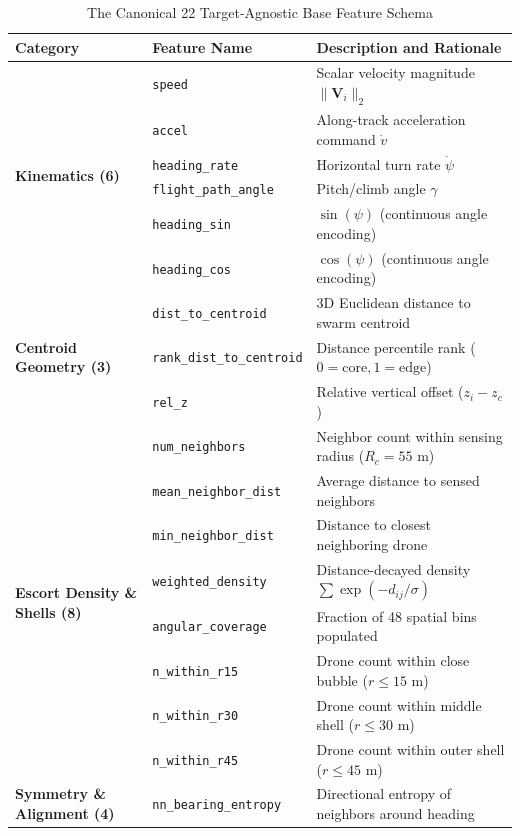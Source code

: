 \documentclass[9pt]{ieeeconf}
\begin{document}
\begin{table}[h]
\centering
\caption{The Canonical 22 Target-Agnostic Base Feature Schema}
\label{tab:feature_schema}
\scriptsize
\begin{tabularx}{\columnwidth}{l l X}
\toprule
\textbf{Category} & \textbf{Feature Name} & \textbf{Description and Rationale} \\
\midrule
\multirow{6}{*}{\textbf{Kinematics (6)}} 
& \texttt{speed} & Scalar velocity magnitude $\|\mathbf{V}_i\|_2$ \\
& \texttt{accel} & Along-track acceleration command $\dot{v}$ \\
& \texttt{heading\_rate} & Horizontal turn rate $\dot{\psi}$ \\
& \texttt{flight\_path\_angle} & Pitch/climb angle $\gamma$ \\
& \texttt{heading\_sin} & $\sin(\psi)$ (continuous angle encoding) \\
& \texttt{heading\_cos} & $\cos(\psi)$ (continuous angle encoding) \\
\midrule
\multirow{3}{*}{\textbf{Centroid Geometry (3)}} 
& \texttt{dist\_to\_centroid} & 3D Euclidean distance to swarm centroid \\
& \texttt{rank\_dist\_to\_centroid} & Distance percentile rank ($0=\text{core}, 1=\text{edge}$) \\
& \texttt{rel\_z} & Relative vertical offset ($z_i - z_c$) \\
\midrule
\multirow{8}{*}{\textbf{Escort Density \& Shells (8)}} 
& \texttt{num\_neighbors} & Neighbor count within sensing radius ($R_c = 55\text{ m}$) \\
& \texttt{mean\_neighbor\_dist} & Average distance to sensed neighbors \\
& \texttt{min\_neighbor\_dist} & Distance to closest neighboring drone \\
& \texttt{weighted\_density} & Distance-decayed density $\sum \exp(-d_{ij}/\sigma)$ \\
& \texttt{angular\_coverage} & Fraction of 48 spatial bins populated \\
& \texttt{n\_within\_r15} & Drone count within close bubble ($r \le 15\text{ m}$) \\
& \texttt{n\_within\_r30} & Drone count within middle shell ($r \le 30\text{ m}$) \\
& \texttt{n\_within\_r45} & Drone count within outer shell ($r \le 45\text{ m}$) \\
\midrule
\multirow{4}{*}{\textbf{Symmetry \& Alignment (4)}} 
& \texttt{nn\_bearing\_entropy} & Directional entropy of neighbors around heading \\

\end{tabularx}
\end{table}
\end{document}
